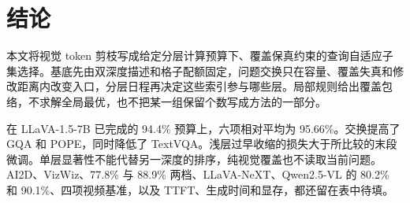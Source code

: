 \section{结论}
\label{sec:conclusion}

本文将视觉 token 剪枝写成给定分层计算预算下、覆盖保真约束的查询自适应子集选择。基底先由双深度描述和格子配额固定，问题交换只在容量、覆盖失真和修改距离内改变入口，分层日程再决定这些索引参与哪些层。局部规则给出覆盖包络，不求解全局最优，也不把某一组保留个数写成方法的一部分。

在 LLaVA-1.5-7B 已完成的 94.4\% 预算上，六项相对平均为 95.66\%。交换提高了 GQA 和 POPE，同时降低了 TextVQA。浅层过早收缩的损失大于所比较的末段微调。单层显著性不能代替另一深度的排序，纯视觉覆盖也不读取当前问题。AI2D、VizWiz、77.8\% 与 88.9\% 两档、LLaVA-NeXT、Qwen2.5-VL 的 80.2\% 和 90.1\%、四项视频基准，以及 TTFT、生成时间和显存，都还留在表中待填。
